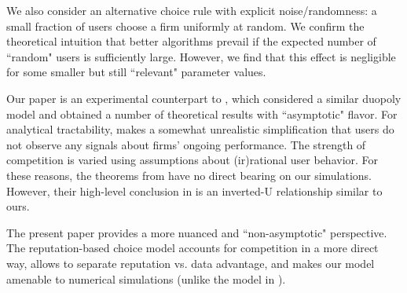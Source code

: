 \documentclass[format=acmsmall, review=false]{acmart}
\theoremstyle{definition}
\newcommand{\xhdr}[1]{\vspace{1mm} \noindent{\bf #1}}
\begin{document}
We also consider an alternative choice rule with explicit noise/randomness: a small fraction of users choose a firm uniformly at random. We confirm the theoretical intuition that better algorithms prevail if the expected number of ``random" users is sufficiently large. However, we find that this effect is negligible for some smaller but still ``relevant" parameter values.

\xhdr{Discussion.}
Our paper is an experimental counterpart to \cite{CompetingBandits-itcs18}, which considered a similar duopoly model and obtained a number of theoretical results with ``asymptotic" flavor. For analytical tractability, \cite{CompetingBandits-itcs18} makes a somewhat unrealistic simplification that users do not observe any signals about firms' ongoing performance. The strength of competition is varied using assumptions about (ir)rational user behavior. For these reasons, the theorems from \cite{CompetingBandits-itcs18} have no direct bearing on our simulations. However, their high-level conclusion in is an inverted-U relationship similar to ours.

The present paper provides a more nuanced and ``non-asymptotic" perspective. The reputation-based choice model accounts for competition in a more direct way, allows to separate reputation vs. data advantage, and makes our model amenable to numerical simulations (unlike the model in \cite{CompetingBandits-itcs18}).





\end{document}
